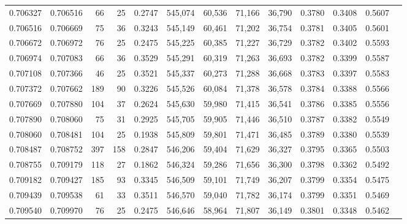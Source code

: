 \begin{tabular}{rrrrrrrrrrrrr}
0.706327 & 0.706516 &    66 &  25 &                                     0.2747 & 545,074 &  60,536 &  71,166 &  36,790 & 0.3780 & 0.3408 & 0.5607 \\
0.706516 & 0.706669 &    75 &  36 &                                     0.3243 & 545,149 &  60,461 &  71,202 &  36,754 & 0.3781 & 0.3405 & 0.5601 \\
0.706672 & 0.706972 &    76 &  25 &                                     0.2475 & 545,225 &  60,385 &  71,227 &  36,729 & 0.3782 & 0.3402 & 0.5593 \\
0.706974 & 0.707083 &    66 &  36 &                                     0.3529 & 545,291 &  60,319 &  71,263 &  36,693 & 0.3782 & 0.3399 & 0.5587 \\
0.707108 & 0.707366 &    46 &  25 &                                     0.3521 & 545,337 &  60,273 &  71,288 &  36,668 & 0.3783 & 0.3397 & 0.5583 \\
0.707372 & 0.707662 &   189 &  90 &                                     0.3226 & 545,526 &  60,084 &  71,378 &  36,578 & 0.3784 & 0.3388 & 0.5566 \\
0.707669 & 0.707880 &   104 &  37 &                                     0.2624 & 545,630 &  59,980 &  71,415 &  36,541 & 0.3786 & 0.3385 & 0.5556 \\
0.707890 & 0.708060 &    75 &  31 &                                     0.2925 & 545,705 &  59,905 &  71,446 &  36,510 & 0.3787 & 0.3382 & 0.5549 \\
0.708060 & 0.708481 &   104 &  25 &                                     0.1938 & 545,809 &  59,801 &  71,471 &  36,485 & 0.3789 & 0.3380 & 0.5539 \\
0.708487 & 0.708752 &   397 & 158 &                                     0.2847 & 546,206 &  59,404 &  71,629 &  36,327 & 0.3795 & 0.3365 & 0.5503 \\
0.708755 & 0.709179 &   118 &  27 &                                     0.1862 & 546,324 &  59,286 &  71,656 &  36,300 & 0.3798 & 0.3362 & 0.5492 \\
0.709182 & 0.709427 &   185 &  93 &                                     0.3345 & 546,509 &  59,101 &  71,749 &  36,207 & 0.3799 & 0.3354 & 0.5475 \\
0.709439 & 0.709538 &    61 &  33 &                                     0.3511 & 546,570 &  59,040 &  71,782 &  36,174 & 0.3799 & 0.3351 & 0.5469 \\
0.709540 & 0.709970 &    76 &  25 &                                     0.2475 & 546,646 &  58,964 &  71,807 &  36,149 & 0.3801 & 0.3348 & 0.5462 \\

\end{tabular}
